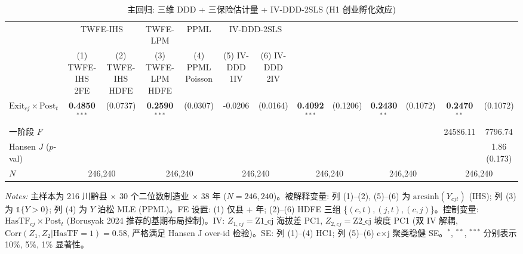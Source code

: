 \begin{table}[htbp]
\centering
\small
\caption{主回归: 三维 DDD + 三保险估计量 + IV-DDD-2SLS (H1 创业孵化效应)}
\label{tab:main}
\begin{tabular}{lcccccccccccc}
\hline\hline
 & \multicolumn{2}{c}{TWFE-IHS} & TWFE-LPM & PPML & \multicolumn{2}{c}{IV-DDD-2SLS} \\
\cmidrule(lr){2-3} \cmidrule(lr){4-4} \cmidrule(lr){5-5} \cmidrule(lr){6-7}
 & (1) TWFE-IHS 2FE  & (2) TWFE-IHS HDFE  & (3) TWFE-LPM HDFE  & (4) PPML Poisson  & (5) IV-DDD 1IV  & (6) IV-DDD 2IV \\
\hline
$\mathrm{Exit}_{cj}\times\mathrm{Post}_t$ & \textbf{0.4850}$^{***}$ & (0.0737) & \textbf{0.2590}$^{***}$ & (0.0307) & -0.0206 & (0.0164) & \textbf{0.4092}$^{***}$ & (0.1206) & \textbf{0.2430}$^{**}$ & (0.1072) & \textbf{0.2470}$^{**}$ & (0.1072) \\
一阶段 $F$ & & & & & & & & & & & 24586.11 & 7796.74 \\
Hansen $J$ ($p$-val) & & & & & & & & & & & & 1.86 (0.173) \\
$N$ & \multicolumn{2}{c}{246,240} & \multicolumn{2}{c}{246,240} & \multicolumn{2}{c}{246,240} & \multicolumn{2}{c}{246,240} & \multicolumn{2}{c}{246,240} & \multicolumn{2}{c}{246,240} \\
\hline\hline
\end{tabular}
\begin{flushleft}\footnotesize
\textit{Notes:} 主样本为 216 川黔县 $\times$ 30 个二位数制造业 $\times$ 38 年 ($N=246{,}240$)。被解释变量: 列 (1)--(2), (5)--(6) 为 $\mathrm{arcsinh}(Y_{cjt})$ (IHS); 列 (3) 为 $\mathbb{1}\{Y>0\}$; 列 (4) 为 $Y$ 泊松 MLE (PPML)。FE 设置: (1) 仅县 + 年; (2)--(6) HDFE 三组 \{$(c,t), (j,t), (c,j)$\}。控制变量: $\mathrm{HasTF}_{cj}\times\mathrm{Post}_t$ (Borusyak 2024 推荐的基期布局控制)。IV: $Z_{1,cj}=\mathrm{Z1\_cj}$ 海拔差 PC1, $Z_{2,cj}=\mathrm{Z2\_cj}$ 坡度 PC1 (双 IV 解耦, $\mathrm{Corr}(Z_1,Z_2|\mathrm{HasTF}=1)=0.58$, 严格满足 Hansen J over-id 检验)。SE: 列 (1)--(4) HC1; 列 (5)--(6) c$\times$j 聚类稳健 SE。$^{*}$, $^{**}$, $^{***}$ 分别表示 10\%, 5\%, 1\% 显著性。
\end{flushleft}
\end{table}
